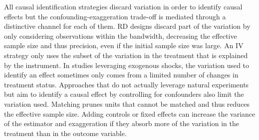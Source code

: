 			
			
			All causal identification strategies discard variation in order to identify causal effects but the confounding-exaggeration trade-off is mediated through a distinctive channel for each of them. RD designs discard part of the variation by only considering observations within the bandwidth, decreasing the effective sample size and thus precision, even if the initial sample size was large. An IV strategy only uses the subset of the variation in the treatment that is explained by the instrument. In studies leveraging exogenous shocks, the variation used to identify an effect sometimes only comes from a limited number of changes in treatment status. Approaches that do not actually leverage natural experiments but aim to identify a causal effect by controlling for confounders also limit the variation used. 
			Matching prunes units that cannot be matched and thus reduces the effective sample size. 
			Adding controls or fixed effects can increase the variance of the estimator and exaggeration if they absorb more of the variation in the treatment than in the outcome variable. 
			
